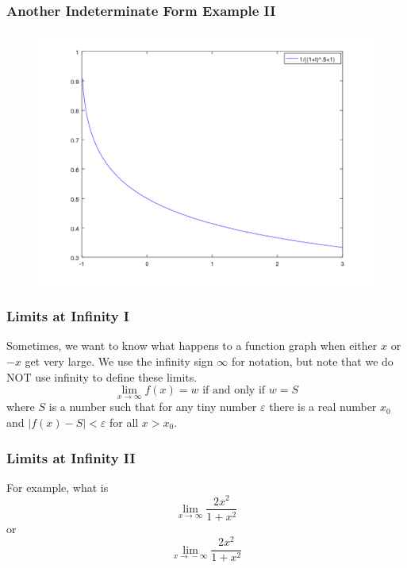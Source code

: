 \documentclass[xcolor=dvipsnames]{beamer}
\begin{document}
\begin{frame}
  \frametitle{Another Indeterminate Form Example II}
  \begin{figure}[h]
    \includegraphics[scale=.5]{./diagrams/indeterminate.png}
  \end{figure}
\end{frame}

\begin{frame}
  \frametitle{Limits at Infinity I}
Sometimes, we want to know what happens to a function graph when
either $x$ or $-x$ get very large. We use the infinity sign $\infty$
for notation, but note that we do NOT use infinity to define these
limits. 
\begin{equation}
  \label{eq:xetieshe}
  \lim_{x\rightarrow{}\infty}f(x)=w\mbox{ if and only if }w=S
\end{equation}
where $S$ is a number such that for any tiny number $\varepsilon$
there is a real number $x_{0}$ and
$\vert{}f(x)-S\vert<\varepsilon$ for all $x>x_{0}$.
\end{frame}

\begin{frame}
  \frametitle{Limits at Infinity II}
For example, what is
\begin{equation}
  \label{eq:wingeisa}
  \lim_{x\rightarrow\infty}\frac{2x^{2}}{1+x^{2}}
\end{equation}
or
\begin{equation}
  \label{eq:ahxaibah}
  \lim_{x\rightarrow{}-\infty}\frac{2x^{2}}{1+x^{2}}
\end{equation}
\end{frame}
\end{document}
